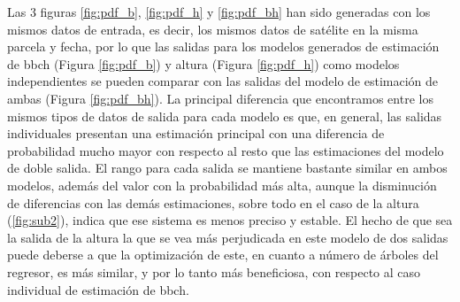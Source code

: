 \par Las 3 figuras \ref{fig:pdf_b}, \ref{fig:pdf_h} y \ref{fig:pdf_bh} han sido generadas con los mismos datos de entrada, es decir, los mismos datos de satélite en la misma parcela y fecha, por lo que las salidas para los modelos generados de estimación de \gls{bbch} (Figura \ref{fig:pdf_b}) y altura (Figura \ref{fig:pdf_h}) como modelos independientes se pueden comparar con las salidas del modelo de estimación de ambas (Figura \ref{fig:pdf_bh}). La principal diferencia que encontramos entre los mismos tipos de datos de salida para cada modelo es que, en general, las salidas individuales presentan una estimación principal con una diferencia de probabilidad mucho mayor con respecto al resto que las estimaciones del modelo de doble salida. El rango para cada salida se mantiene bastante similar en ambos modelos, además del valor con la probabilidad más alta, aunque la disminución de diferencias con las demás estimaciones, sobre todo en el caso de la altura (\ref{fig:sub2}), indica que ese sistema es menos preciso y estable. El hecho de que sea la salida de la altura la que se vea más perjudicada en este modelo de dos salidas puede deberse a que la optimización de este, en cuanto a número de árboles del regresor, es más similar, y por lo tanto más beneficiosa, con respecto al caso individual de estimación de \gls{bbch}.

